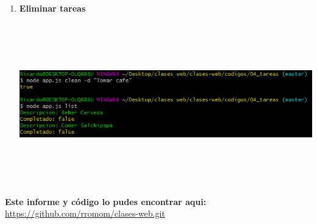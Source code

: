 \documentclass{report}
\begin{document}
\begin{enumerate}
\begin{center}
  \end{center}
  \item \textbf{Eliminar tareas}
  \begin{center}
    \includegraphics[width=15cm, height=7cm]{10.png}
  \end{center}

\end{enumerate}
\textbf{Este informe y código lo pudes encontrar aqui: } \url{https://github.com/rromom/clases-web.git}
\end{document}
